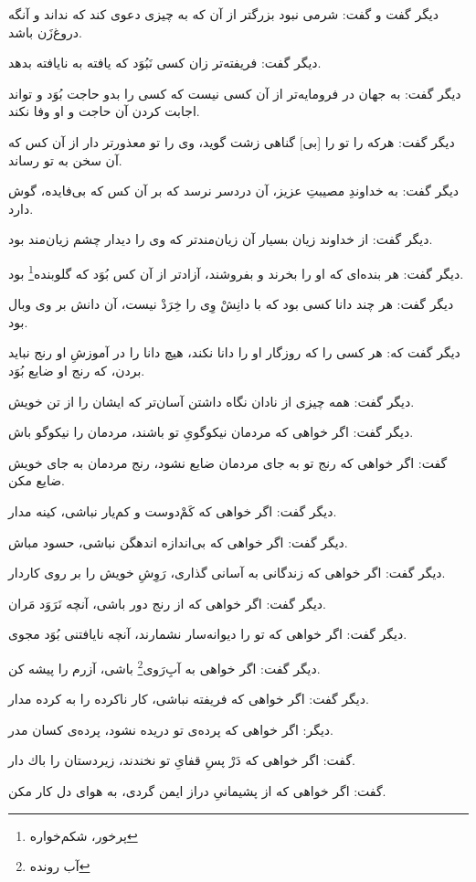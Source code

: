 ديگر گفت و گفت: شرمى نبود بزرگتر از آن كه به چيزى دعوى كند كه نداند و آنگه دروغ‌زَن باشد.

ديگر گفت: فريفته‌تر زان كسى نَبُوَد كه يافته به نايافته بدهد.

ديگر گفت: به جهان در فرومايه‌تر از آن كسى نيست كه كسى را بدو حاجت بُوَد و تواند اجابت كردن آن حاجت و او وفا نكند.

ديگر گفت: هركه را تو را [بى] گناهى زشت گويد، وى را تو معذورتر دار از آن كس كه آن سخن به تو رساند.

ديگر گفت: به خداوندِ مصيبتِ عزيز، آن دردسر نرسد كه بر آن كس كه بى‌فايده، گوش دارد.

ديگر گفت: از خداوند زيان بسيار آن زيان‌مندتر كه وى را ديدار چشم زيان‌مند بود.

ديگر گفت: هر بنده‌اى كه او را بخرند و بفروشند، آزادتر از آن كس بُوَد كه گلوبنده\footnote{پرخور، شکم‌خواره} بود.

ديگر گفت: هر چند دانا كسى بود كه با دانِشْ وِى را خِرَدْ نيست، آن دانش بر وى وبال بود.

ديگر گفت كه: هر كسى را كه روزگار او را دانا نكند، هيچ دانا را در آموزشِ او رنج نبايد بردن، كه رنج او ضايع بُوَد.

ديگر گفت: همه چيزى از نادان نگاه داشتن آسان‌تر كه ايشان را از تن خويش.

ديگر گفت: اگر خواهى كه مردمان نيكوگوىِ تو باشند، مردمان را نيكوگو باش.

 گفت: اگر خواهى كه رنج تو به جاى مردمان ضايع نشود، رنج مردمان به جاى خويش ضايع مكن.

ديگر گفت: اگر خواهى كه كَم‌ْدوست و كم‌يار نباشى، كينه مدار.

ديگر گفت: اگر خواهى كه بى‌اندازه اندهگن نباشى، حسود مباش.

ديگر گفت: اگر خواهى كه زندگانى به آسانى گذارى، رَوِشِ خويش را بر روى كاردار.

ديگر گفت: اگر خواهى كه از رنج دور باشى، آنچه نَرَوَد مَران.

ديگر گفت: اگر خواهى كه تو را ديوانه‌سار نشمارند، آنچه نايافتنى بُوَد مجوى.

ديگر گفت: اگر خواهى به آبِ‌رَوى\footnote{آب رونده} باشى، آزرم را پيشه كن.

ديگر گفت: اگر خواهى كه فريفته نباشى، كار ناكرده را به كرده مدار.

ديگر: اگر خواهى كه پرده‌ی تو دريده نشود، پرده‌ی كسان مدر.

گفت: اگر خواهى كه دَرْ پسِ قفاىِ تو نخندند، زيردستان را باك دار.

گفت: اگر خواهى كه از پشيمانىِ دراز ايمن گردى، به هواى دل كار مكن.

